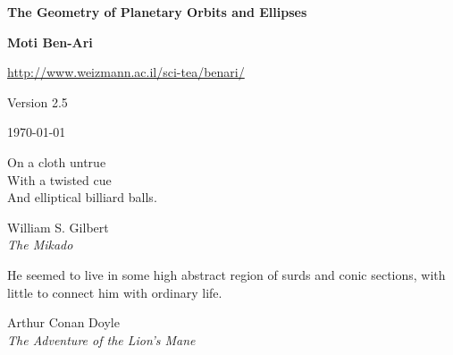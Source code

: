 


\thispagestyle{empty}

\begin{center}
\textbf{\LARGE The Geometry of Planetary Orbits and Ellipses}

\bigskip
\bigskip
\bigskip

\textbf{\Large Moti Ben-Ari}

\bigskip

\url{http://www.weizmann.ac.il/sci-tea/benari/}

\bigskip

Version 2.5

\bigskip

\today

\end{center}

\vspace*{10ex}

\hfill\begin{minipage}{.4\textwidth}
\small On a cloth untrue\\With a twisted cue\\And elliptical billiard balls.
\begin{flushright}
William S. Gilbert\\\textit{The Mikado}
\end{flushright}
\end{minipage}

\vspace*{4ex}


\hfill\begin{minipage}{.4\textwidth}
\small He seemed to live in some high abstract region of surds and conic sections, with little to connect him with ordinary life.
\begin{flushright}
Arthur Conan Doyle\\\textit{The Adventure of the Lion’s Mane}
\end{flushright}
\end{minipage}



